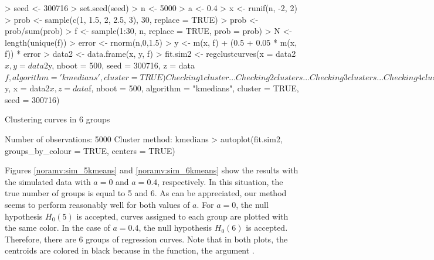 \begin{example}
> seed <- 300716
> set.seed(seed)
> n <- 5000
> a <- 0.4
> x <- runif(n, -2, 2)
> prob <- sample(c(1, 1.5, 2, 2.5, 3), 30, replace = TRUE)
> prob <- prob/sum(prob)
> f <- sample(1:30, n, replace = TRUE, prob = prob)
> N <- length(unique(f))
> error <- rnorm(n,0,1.5)
> y <- m(x, f) + (0.5 + 0.05 * m(x, f)) * error
> data2 <- data.frame(x, y, f)
> fit.sim2 <- regclustcurves(x = data2$x, y = data2$y,  nboot = 500, seed = 300716,
                         z = data$f, algorithm = 'kmedians', cluster = TRUE)		       
Checking 1 cluster... 
Checking 2 clusters... 
Checking 3 clusters... 
Checking 4 clusters... 
Checking 5 clusters... 
Checking 6 clusters... 

Finally, there are 6 clusters. 
> fit.sim2

Call:  
regclustcurves(y = data2$y, x = data2$x, z = data$f, nboot = 500, 
    algorithm = "kmedians", cluster = TRUE, seed = 300716)

Clustering curves in 6 groups

Number of observations:  5000
Cluster method:  kmedians
> autoplot(fit.sim2, groups_by_colour = TRUE, centers = TRUE)
\end{example}



Figures \ref{noramv:sim_5kmeans} and  \ref{noramv:sim_6kmeans} show the results  with the simulated data with $a=0$ and  $a=0.4$, respectively. In this situation, the true number of groups is equal to 5 and 6.  As can be appreciated, our method seems to perform reasonably well for both values of $a$. For $a=0$, the null hypothesis $H_0(5)$ is accepted, curves assigned to each group are plotted with the same color. In the case of $a=0.4$, the null hypothesis $H_0(6)$ is accepted.  Therefore, there are 6 groups of regression curves.  Note that in both plots, the centroids are colored in black because in the  function, the argument  . 




